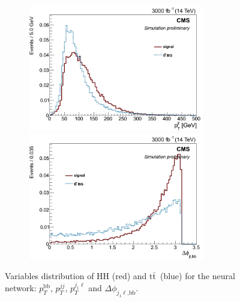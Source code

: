 \documentclass[10pt,a4paper]{article}
\newcommand{\ww}{7.7cm} %
\newcommand{\dd}{-2mm} %
\renewcommand{\tt}{\ensuremath{\text{t}\bar{\text{t}}}}
\begin{document}
\begin{figure}[h]
  \begin{subfigure}[b]{17cm}
    \begin{minipage}[h!]{\ww}
      \centering
      \includegraphics[width=\ww]{figs/Pt_j1l.png}
    \end{minipage}
    \begin{minipage}[h!]{\ww}
      \centering
      \includegraphics[width=\ww]{figs/DeltaPhi_j1lbb.png}
    \end{minipage}
    \hspace{9mm}
  \end{subfigure}	
  \vspace{\dd}
  \caption{Variables distribution of HH (red) and \tt\ (blue) for the neural network: $p_T^\text{bb}$, $p_T^{jj}$, $p_T^{j_1\ell}$ and $\Delta\phi_{j_1\ell\text{,bb}}$.} \label{vars4}

\end{figure}
\end{document}
